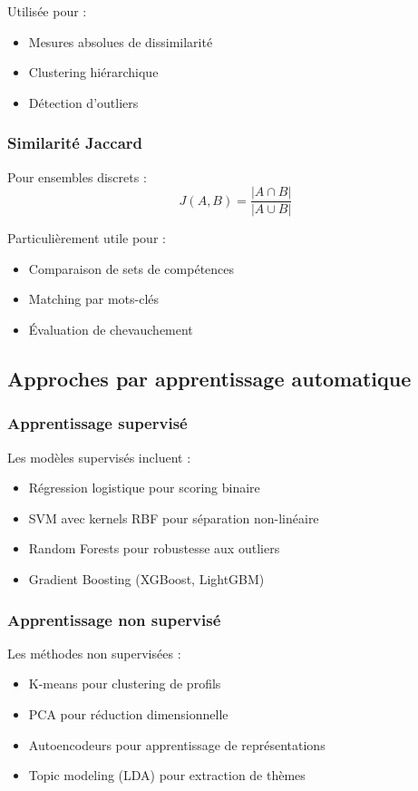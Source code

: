 \documentclass[12pt,a4paper]{report}
\begin{document}
Utilisée pour :
\begin{itemize}
\item Mesures absolues de dissimilarité
\item Clustering hiérarchique
\item Détection d'outliers
\end{itemize}

\subsubsection{Similarité Jaccard}

Pour ensembles discrets :
\begin{equation}
J(A,B) = \frac{|A \cap B|}{|A \cup B|}
\end{equation}

Particulièrement utile pour :
\begin{itemize}
\item Comparaison de sets de compétences
\item Matching par mots-clés
\item Évaluation de chevauchement
\end{itemize}

\subsection{Approches par apprentissage automatique}

\subsubsection{Apprentissage supervisé}

Les modèles supervisés incluent :
\begin{itemize}
\item Régression logistique pour scoring binaire
\item SVM avec kernels RBF pour séparation non-linéaire
\item Random Forests pour robustesse aux outliers
\item Gradient Boosting (XGBoost, LightGBM)
\end{itemize}

\subsubsection{Apprentissage non supervisé}

Les méthodes non supervisées :
\begin{itemize}
\item K-means pour clustering de profils
\item PCA pour réduction dimensionnelle
\item Autoencodeurs pour apprentissage de représentations
\item Topic modeling (LDA) pour extraction de thèmes
\end{itemize}
\end{document}

